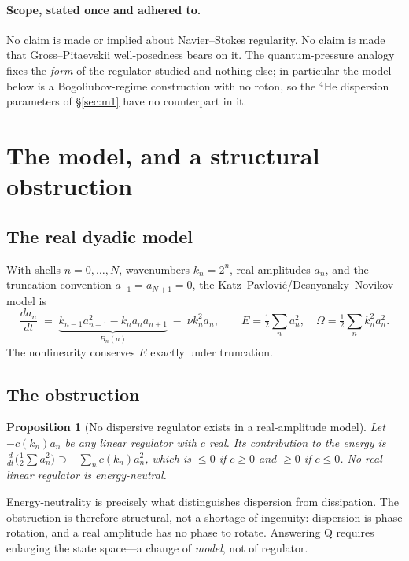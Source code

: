 \documentclass[11pt,a4paper]{article}
\newtheorem{proposition}[theorem]{Proposition}
\theoremstyle{definition}
\theoremstyle{remark}
\begin{document}
\paragraph{Scope, stated once and adhered to.} No claim is made or implied about
Navier--Stokes regularity. No claim is made that Gross--Pitaevskii well-posedness bears on
it. The quantum-pressure analogy fixes the \emph{form} of the regulator studied and
nothing else; in particular the model below is a Bogoliubov-regime construction with no
roton, so the $^4$He dispersion parameters of \S\ref{sec:m1} have no counterpart in it.

\section{The model, and a structural obstruction}
\label{sec:model}

\subsection{The real dyadic model}

With shells $n=0,\dots,N$, wavenumbers $k_n=2^n$, real amplitudes $a_n$, and the
truncation convention $a_{-1}=a_{N+1}=0$, the Katz--Pavlovi\'c/Desnyansky--Novikov model is
\begin{equation}
  \frac{da_n}{dt} \;=\; \underbrace{k_{n-1}a_{n-1}^2 - k_n a_n a_{n+1}}_{B_n(a)}
  \;-\; \nu k_n^2 a_n ,
  \qquad
  E = \tfrac12\textstyle\sum_n a_n^2, \quad
  \Omega = \tfrac12\textstyle\sum_n k_n^2 a_n^2 .
  \label{eq:real}
\end{equation}
The nonlinearity conserves $E$ exactly under truncation.

\subsection{The obstruction}

\begin{proposition}[No dispersive regulator exists in a real-amplitude model]
\label{prop:obstruction}
Let $-c(k_n)a_n$ be any linear regulator with $c$ real. Its contribution to the energy is
$\frac{d}{dt}\big(\tfrac12\sum a_n^2\big) \supset -\sum_n c(k_n)a_n^2$, which is
$\le 0$ if $c\ge0$ and $\ge 0$ if $c\le0$. \emph{No} real linear regulator is
energy-neutral.
\end{proposition}

Energy-neutrality is precisely what distinguishes dispersion from dissipation. The
obstruction is therefore structural, not a shortage of ingenuity: dispersion is phase
rotation, and a real amplitude has no phase to rotate. Answering Q requires enlarging the
state space---a change of \emph{model}, not of regulator.
\end{document}
